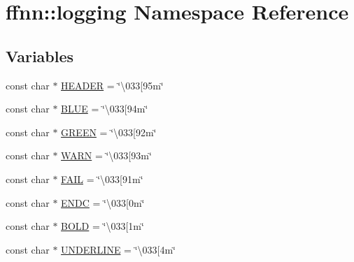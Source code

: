 \hypertarget{namespaceffnn_1_1logging}{\section{ffnn\-:\-:logging Namespace Reference}
\label{namespaceffnn_1_1logging}
}
\subsection*{Variables}
\begin{DoxyCompactItemize}
\item 
const char $\ast$ \hyperlink{group___unicode_color_definitions_ga65590452b7707feb609f43a9ca306d42}{H\-E\-A\-D\-E\-R} = \char`\"{}\textbackslash{}033\mbox{[}95m\char`\"{}
\item 
const char $\ast$ \hyperlink{group___unicode_color_definitions_ga3e2c8118c023bd9d8bb394366f943cc5}{B\-L\-U\-E} = \char`\"{}\textbackslash{}033\mbox{[}94m\char`\"{}
\item 
const char $\ast$ \hyperlink{group___unicode_color_definitions_ga00119b4fa7f1c1e88aec7e09e2215298}{G\-R\-E\-E\-N} = \char`\"{}\textbackslash{}033\mbox{[}92m\char`\"{}
\item 
const char $\ast$ \hyperlink{group___unicode_color_definitions_gafc935a693ebe97569c82dd2415bb7373}{W\-A\-R\-N} = \char`\"{}\textbackslash{}033\mbox{[}93m\char`\"{}
\item 
const char $\ast$ \hyperlink{group___unicode_color_definitions_ga2047db0e31e0a45c7c213845567afc06}{F\-A\-I\-L} = \char`\"{}\textbackslash{}033\mbox{[}91m\char`\"{}
\item 
const char $\ast$ \hyperlink{group___unicode_color_definitions_gab21e47dcbc216f8fc7de88bd217f9f0a}{E\-N\-D\-C} = \char`\"{}\textbackslash{}033\mbox{[}0m\char`\"{}
\item 
const char $\ast$ \hyperlink{group___unicode_color_definitions_ga32fca3fc24af93ce9c4ca33b4a6a3dde}{B\-O\-L\-D} = \char`\"{}\textbackslash{}033\mbox{[}1m\char`\"{}
\item 
const char $\ast$ \hyperlink{group___unicode_color_definitions_gab2b4d719c3fe8672abf96e00a37c799c}{U\-N\-D\-E\-R\-L\-I\-N\-E} = \char`\"{}\textbackslash{}033\mbox{[}4m\char`\"{}
\end{DoxyCompactItemize}
